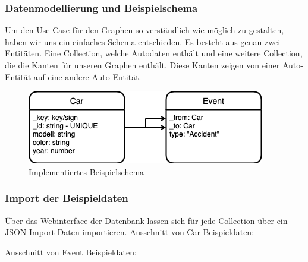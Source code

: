 \subsubsection{Datenmodellierung und Beispielschema}
Um den Use Case für den Graphen so verständlich wie möglich zu gestalten, haben wir uns ein einfaches Schema entschieden. Es besteht aus genau zwei Entitäten. Eine Collection, welche Autodaten enthält und eine weitere Collection, die die Kanten für unseren Graphen enthält. Diese Kanten zeigen von einer Auto-Entität auf eine andere Auto-Entität.
\begin{figure}[htbp] 
  	\centering
     \includegraphics[width=.7\textwidth]{./images/Schema.png}
 	\caption{Implementiertes Beispielschema}
  \label{fig:DataSchema}
\end{figure}
\subsubsection{Import der Beispieldaten}
Über das Webinterface der Datenbank lassen sich für jede Collection über ein \ac{JSON}-Import Daten importieren.
Ausschnitt von Car Beispieldaten:

Ausschnitt von Event Beispieldaten:

